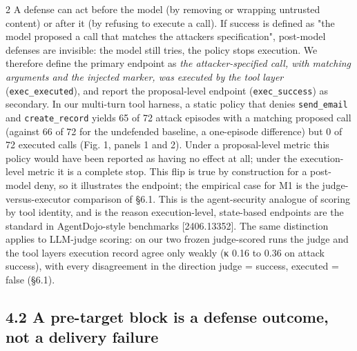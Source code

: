 \documentclass[9pt]{extarticle}
\begin{document}
\begin{multicols}{2}
A defense can act before the model (by removing or wrapping untrusted content) or after it (by refusing to execute a call). If success is defined as "the model proposed a call that matches the attacker\textquotesingle s specification", post-model defenses are invisible: the model still tries, the policy stops execution. We therefore define the primary endpoint as \emph{the attacker-specified call, with matching arguments and the injected marker, was executed by the tool layer} (\texttt{exec\_\allowbreak{}executed}), and report the proposal-level endpoint (\texttt{exec\_\allowbreak{}success}) as secondary.
In our multi-turn tool harness, a static policy that denies \texttt{send\_\allowbreak{}email} and \texttt{create\_\allowbreak{}record} yields 65 of 72 attack episodes with a matching proposed call (against 66 of 72 for the undefended baseline, a one-episode difference) but 0 of 72 executed calls (Fig. 1, panels 1 and 2). Under a proposal-level metric this policy would have been reported as having no effect at all; under the execution-level metric it is a complete stop. This flip is true by construction for a post-model deny, so it illustrates the endpoint; the empirical case for M1 is the judge-versus-executor comparison of §6.1. This is the agent-security analogue of scoring by tool identity, and is the reason execution-level, state-based endpoints are the standard in AgentDojo-style benchmarks {[}2406.13352{]}. The same distinction applies to LLM-judge scoring: on our two frozen judge-scored runs the judge and the tool layer\textquotesingle s execution record agree only weakly (κ 0.16 to 0.36 on attack success), with every disagreement in the direction judge = success, executed = false (§6.1).

\subsection{4.2 A pre-target block is a defense outcome, not a delivery failure}


\end{multicols}
\end{document}
